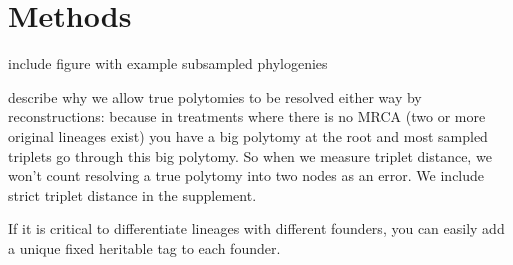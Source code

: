 \section{Methods} \label{sec:methods}

include figure with example subsampled phylogenies

describe why we allow true polytomies to be resolved either way by reconstructions: because in treatments where there is no MRCA (two or more original lineages exist) you have a big polytomy at the root and most sampled triplets go through this big polytomy.
So when we measure triplet distance, we won't count resolving a true polytomy into two nodes as an error.
We include strict triplet distance in the supplement.

If it is critical to differentiate lineages with different founders, you can easily add a unique fixed heritable tag to each founder.
